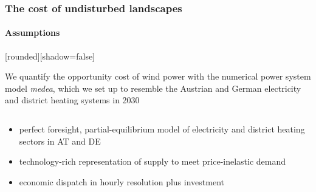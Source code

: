 \documentclass[aspectratio=1610, xcolor=dvipsnames]{beamer}
\begin{document}
    \begin{frame}
        \frametitle{The cost of undisturbed landscapes}
        \framesubtitle{Assumptions}
        {%
            [rounded][shadow=false]
            \begin{block}{}
                We quantify the opportunity cost of wind power with the numerical power system model \emph{medea}, which we set up
                to resemble the Austrian and German electricity and district heating systems in 2030
            \end{block}
        }%
        \begin{columns}[T]
            \begin{column}{7cm}
                \begin{itemize}
                    \item perfect foresight, partial-equilibrium model of electricity and district heating sectors in
                    AT and DE
                    \item technology-rich representation of supply to meet price-inelastic demand
                    \item economic dispatch in hourly resolution plus investment
                \end{itemize}
            \end{column}


\end{columns}
\end{frame}
\end{document}
